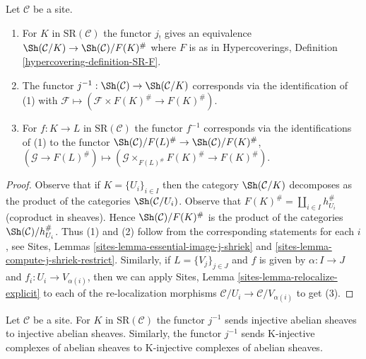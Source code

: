 \begin{lemma}
\label{lemma-localize-compare}
Let $\mathcal{C}$ be a site.
\begin{enumerate}
\item For $K$ in $\text{SR}(\mathcal{C})$ the functor $j_!$
gives an equivalence $\Sh(\mathcal{C}/K) \to \Sh(\mathcal{C})/F(K)^\#$
where $F$ is as in
Hypercoverings, Definition \ref{hypercovering-definition-SR-F}.
\item The functor $j^{-1} : \Sh(\mathcal{C}) \to \Sh(\mathcal{C}/K)$
corresponds via the identification of (1) with
$\mathcal{F} \mapsto (\mathcal{F} \times F(K)^\# \to F(K)^\#)$.
\item For $f : K \to L$ in $\text{SR}(\mathcal{C})$ the functor
$f^{-1}$ corresponds via the identifications of (1) to the functor
$\Sh(\mathcal{C})/F(L)^\# \to \Sh(\mathcal{C})/F(K)^\#$,
$(\mathcal{G} \to F(L)^\#) \mapsto
(\mathcal{G} \times_{F(L)^\#} F(K)^\# \to F(K)^\#)$.
\end{enumerate}
\end{lemma}

\begin{proof}
Observe that if $K = \{U_i\}_{i \in I}$ then the category
$\Sh(\mathcal{C}/K)$ decomposes as the product of the categories
$\Sh(\mathcal{C}/U_i)$. Observe that
$F(K)^\# = \coprod_{i \in I} h_{U_i}^\#$ (coproduct in sheaves).
Hence $\Sh(\mathcal{C})/F(K)^\#$ is the product of the
categories $\Sh(\mathcal{C})/h_{U_i}^\#$.
Thus (1) and (2) follow from the corresponding
statements for each $i$, see
Sites, Lemmas \ref{sites-lemma-essential-image-j-shriek} and
\ref{sites-lemma-compute-j-shriek-restrict}.
Similarly, if $L = \{V_j\}_{j \in J}$ and $f$ is given
by $\alpha : I \to J$ and $f_i : U_i \to V_{\alpha(i)}$,
then we can apply
Sites, Lemma \ref{sites-lemma-relocalize-explicit}
to each of the re-localization morphisms
$\mathcal{C}/U_i \to \mathcal{C}/V_{\alpha(i)}$
to get (3).
\end{proof}

\begin{lemma}
\label{lemma-localize-injective}
Let $\mathcal{C}$ be a site. For $K$ in $\text{SR}(\mathcal{C})$
the functor $j^{-1}$ sends injective abelian sheaves to injective
abelian sheaves. Similarly, the functor $j^{-1}$ sends K-injective
complexes of abelian sheaves to K-injective complexes of
abelian sheaves.
\end{lemma}

